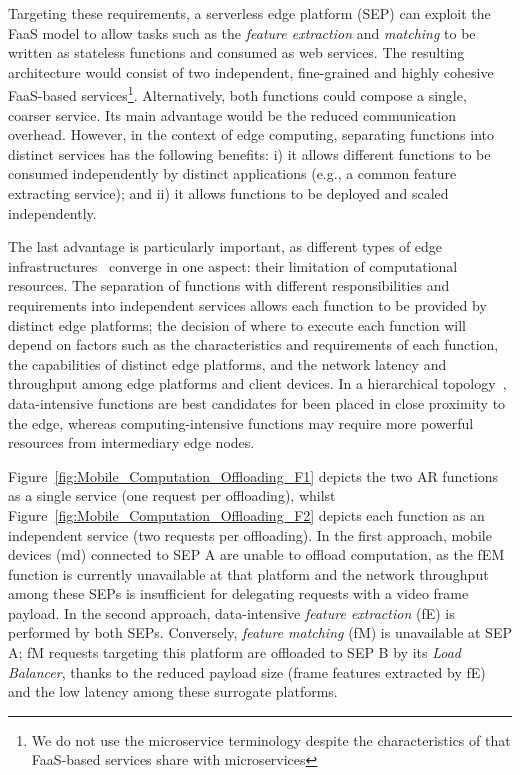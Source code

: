 Targeting these requirements, a serverless edge platform (SEP) can exploit the FaaS model to allow tasks such as the \textit{feature extraction} and \textit{matching} to be written as stateless functions and consumed as web services. The resulting architecture would consist of two independent, fine-grained and highly cohesive FaaS-based services\footnote{We do not use the microservice terminology despite the characteristics of that FaaS-based services share with microservices}. Alternatively, both functions could compose a single, coarser service. Its main advantage would be the reduced communication overhead. However, in the context of edge computing, separating functions into distinct services has the following benefits: i) it allows different functions to be consumed independently by distinct applications (e.g., a common feature extracting service); and ii) it allows functions to be deployed and scaled independently.%

The last advantage is particularly important, as different types of edge infrastructures~\cite{Satyanarayanan:2009,Taleb:2013,Liu:2014,K.Wang:2015} converge in one aspect: their limitation of computational resources. The separation of functions with different responsibilities and requirements into independent services allows each function to be provided by distinct edge platforms; the decision of where to execute each function will depend on factors such as the characteristics and requirements of each function, the capabilities of distinct edge platforms, and the network latency and throughput among edge platforms and client devices. In a hierarchical topology~\cite{Liu:2014}, data-intensive functions are best candidates for been placed in close proximity to the edge, whereas computing-intensive functions may require more powerful resources from intermediary edge nodes. 

Figure~\ref{fig:Mobile_Computation_Offloading_F1} depicts the two AR functions as a single service (one request per offloading), whilst Figure~\ref{fig:Mobile_Computation_Offloading_F2} depicts each function as an independent service (two requests per offloading). 
In the first approach, mobile devices (md) connected to SEP A are unable to offload computation, as the fEM function is currently unavailable at that platform and the network throughput among these SEPs is insufficient for delegating requests with a video frame payload.
In the second approach, data-intensive \textit{feature extraction} (fE) is performed by both SEPs. Conversely, \textit{feature matching} (fM) is unavailable at SEP A; fM requests targeting this platform are offloaded to SEP B by its \textit{Load Balancer},
thanks to the reduced payload size (frame features extracted by fE) and the low latency among these surrogate platforms. 



